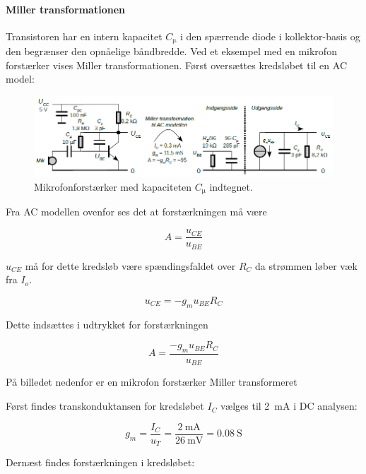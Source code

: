 \documentclass[danish]{article}
\begin{document}
\paragraph{Miller transformationen} 
Transistoren har en intern kapacitet $C_{\si{\micro}}$ i den spærrende diode i kollektor-basis og den begrænser den opnåelige båndbredde.
Ved et eksempel med en mikrofon forstærker vises Miller transformationen. Først oversættes kredsløbet til en AC model:
\begin{figure} [H]
	\centering
	\includegraphics[width=\linewidth]{graphics/millertransformation}
	\caption{Mikrofonforstærker med kapaciteten $C_{\si{\micro}}$ indtegnet.}
	\label{fig:millertransformation}
\end{figure}
Fra AC modellen ovenfor ses det at forstærkningen må være 

\begin{equation} 
A = \dfrac{u_{CE}}{u_{BE}}
\end{equation}

$u_{CE}$ må for dette kredsløb være spændingsfaldet over $R_C$ da strømmen løber væk fra $I_o$.

\begin{equation} 
u_{CE} = -g_m u_{BE}R_C
\end{equation}

Dette indsættes i udtrykket for forstærkningen

\begin{equation} 
A = \dfrac{-g_m u_{BE}R_C}{u_{BE}}
\end{equation}

På billedet nedenfor er en mikrofon forstærker Miller transformeret

Først findes transkonduktansen for kredsløbet $I_C$ vælges til \SI{2}{\milli\ampere} i DC analysen:

\begin{equation} 
g_m = \dfrac{I_C}{u_T} = \dfrac{\SI{2}{\milli\ampere}}{\SI{26}{\milli\volt}} = \SI{0.08}{\siemens}
\end{equation}

Dernæst findes forstærkningen i kredsløbet:
\end{document}
